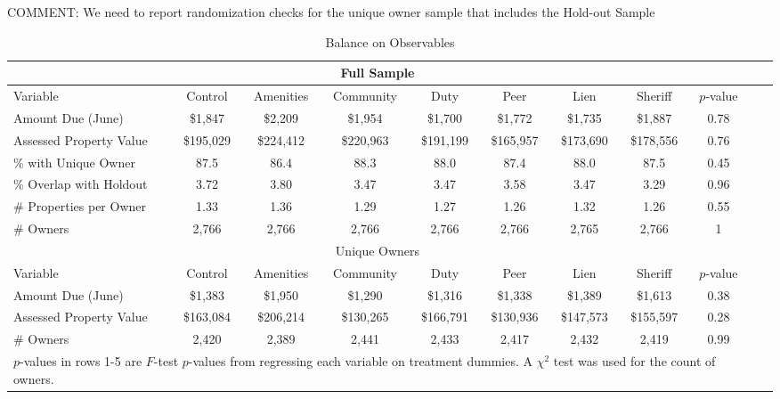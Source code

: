 \documentclass[12pt]{article}
\begin{document}
\noindent COMMENT: We need to report randomization checks for the unique owner sample that includes the Hold-out Sample	        

\begin{sidewaystable}[htbp]
\caption{Balance on Observables} \label{balance}
\bigskip
\centering
\begin{tabular}{l c c c c c c c c c c}
\hline
\multicolumn{9}{c}{Full Sample} \\
   \hline
Variable & Control & Amenities & Community & Duty & Peer & Lien & Sheriff & $p$-value \\ 
   \hline
Amount Due (June) & \$1,847 & \$2,209 & \$1,954 & \$1,700 & \$1,772 & \$1,735 & \$1,887 & 0.78 \\ 
  Assessed Property Value & \$195,029 & \$224,412 & \$220,963 & \$191,199 & \$165,957 & \$173,690 & \$178,556 & 0.76 \\ 
  \% with Unique Owner & 87.5 & 86.4 & 88.3 & 88.0 & 87.4 & 88.0 & 87.5 & 0.45 \\ 
  \% Overlap with Holdout & 3.72 & 3.80 & 3.47 & 3.47 & 3.58 & 3.47 & 3.29 & 0.96 \\ 
  \# Properties per Owner & 1.33 & 1.36 & 1.29 & 1.27 & 1.26 & 1.32 & 1.26 & 0.55 \\ 
  \# Owners & 2,766 & 2,766 & 2,766 & 2,766 & 2,766 & 2,765 & 2,766 & 1 \\ 
   \hline 
\multicolumn{9}{c}{Unique Owners} \\
   \hline
Variable & Control & Amenities & Community & Duty & Peer & Lien & Sheriff & $p$-value \\ 
   \hline
Amount Due (June) & \$1,383 & \$1,950 & \$1,290 & \$1,316 & \$1,338 & \$1,389 & \$1,613 & 0.38 \\ 
  Assessed Property Value & \$163,084 & \$206,214 & \$130,265 & \$166,791 & \$130,936 & \$147,573 & \$155,597 & 0.28 \\ 
  \# Owners & 2,420 & 2,389 & 2,441 & 2,433 & 2,417 & 2,432 & 2,419 & 0.99 \\ 
   \hline 
 \multicolumn{9}{l}{\scriptsize{$p$-values in rows 1-5 are $F$-test $p$-values from regressing each variable on treatment dummies. A $\chi^2$ test was used for the count of owners.}} \\ 
\end{tabular}

\end{sidewaystable}
\end{document}
